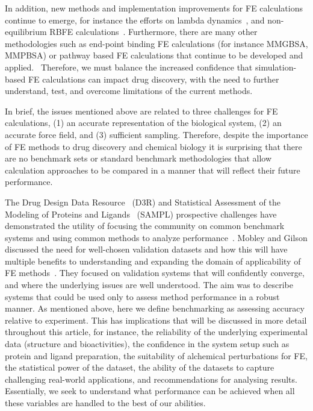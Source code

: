 \documentclass[9pt,bestpractices]{livecoms}
\begin{document}
In addition, new methods and implementation improvements for FE calculations continue to emerge, for instance the efforts on lambda dynamics~\cite{knightMultisiteDynamicsSimulated2011,vilseckPredictingBindingFree2018}, and non-equilibrium RBFE calculations~\cite{gapsysLargeScaleRelative2020,rufaChemicalAccuracyAlchemical2020}. 
Furthermore, there are many other methodologies such as end-point binding FE calculations (for instance MMGBSA, MMPBSA) or pathway based FE calculations that continue to be developed and applied.~\cite{genheden_MM_2015} Therefore, we must balance the increased confidence that simulation-based FE calculations can impact drug discovery, with the need to further understand, test, and overcome limitations of the current methods.

In brief, the issues mentioned above are related to three challenges for FE calculations,
(1) an accurate representation of the biological system, 
(2) an accurate force field, and 
(3) sufficient sampling. 
Therefore, despite the importance of FE methods to drug discovery and chemical biology it is surprising that there are no benchmark sets or standard benchmark methodologies that allow calculation approaches to be compared in a manner that will reflect their future performance. 

The Drug Design Data Resource~\cite{amaro_drug_2021} (D3R) and Statistical Assessment of the Modeling of Proteins and Ligands~\cite{mobley_sampl_2021} (SAMPL) prospective challenges have demonstrated the utility of focusing the community on common benchmark systems and using common methods to analyze performance~\cite{geballe_sampl2_2010,muddana_blind_2012,muddana_prediction_2012,muddana_sampl4_2014,gathiaka_d3r_2016,bannan_blind_2016,yin_overview_2017,gaieb_d3r_2018,gaieb_d3r_2019,parks_d3r_2020}. Mobley and Gilson discussed the need for well-chosen validation datasets and how this will have multiple benefits to understanding and expanding the domain of applicability of FE methods~\cite{mobleyPredictingBindingFree2017}. They focused on validation systems that will confidently converge, and where the underlying issues are well understood. The aim was to describe systems that could be used only to assess method performance in a robust manner. As mentioned above, here we define benchmarking as assessing accuracy relative to experiment. This has implications that will be discussed in more detail throughout this article, for instance, the reliability of the underlying experimental data (structure and bioactivities), the confidence in the system setup such as protein and ligand preparation, the suitability of alchemical perturbations for FE, the statistical power of the dataset, the ability of the datasets to capture challenging real-world applications, and recommendations for analysing results. Essentially, we seek to understand what performance can be achieved when all these variables are handled to the best of our abilities.    
\end{document}
